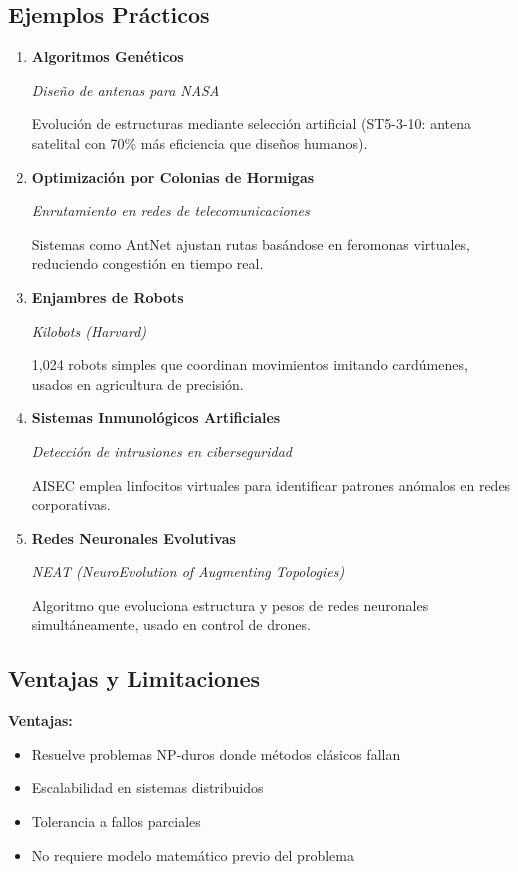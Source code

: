 \documentclass[14pt]{extarticle}
\begin{document}
  \subsection*{Ejemplos Prácticos}
  \begin{enumerate}
    \item \textbf{Algoritmos Genéticos}
    
      \textit{Diseño de antenas para NASA}
    
      Evolución de estructuras mediante selección artificial (ST5-3-10: antena satelital con 70\% más eficiencia que diseños humanos).

    \item \textbf{Optimización por Colonias de Hormigas}
    
      \textit{Enrutamiento en redes de telecomunicaciones}
    
      Sistemas como AntNet ajustan rutas basándose en feromonas virtuales, reduciendo congestión en tiempo real.

    \item \textbf{Enjambres de Robots}
    
      \textit{Kilobots (Harvard)}
    
      1,024 robots simples que coordinan movimientos imitando cardúmenes, usados en agricultura de precisión.

    \item \textbf{Sistemas Inmunológicos Artificiales}
    
      \textit{Detección de intrusiones en ciberseguridad}
    
      AISEC emplea linfocitos virtuales para identificar patrones anómalos en redes corporativas.

    \item \textbf{Redes Neuronales Evolutivas}
    
      \textit{NEAT (NeuroEvolution of Augmenting Topologies)}
    
      Algoritmo que evoluciona estructura y pesos de redes neuronales simultáneamente, usado en control de drones.
  \end{enumerate}

  \subsection*{Ventajas y Limitaciones}

  \textbf{Ventajas:}
  \begin{itemize}
    \item Resuelve problemas NP-duros donde métodos clásicos fallan
    \item Escalabilidad en sistemas distribuidos
    \item Tolerancia a fallos parciales
    \item No requiere modelo matemático previo del problema
  \end{itemize}
\end{document}
